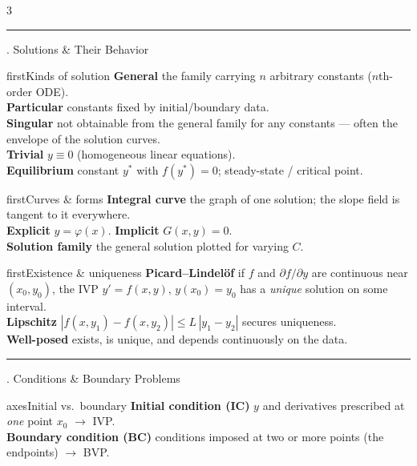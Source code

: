 \documentclass[10pt]{article}
\newcommand{\lab}[1]{\textcolor{ink}{\sffamily\footnotesize\textbf{#1}}\;}
\newcommand{\sect}[2]{%
  \begin{tcolorbox}[blanker, breakable, before skip=2pt, after skip=2pt]
    \begingroup\sffamily\bfseries\normalsize\color{#1}%
    {\color{#1}\rule[-1pt]{3pt}{12pt}}\;#2\endgroup
    \par\vspace{1pt}{\color{#1}\hrule height 1pt}
\end{tcolorbox}}
\begin{document}
\footnotesize\linespread{0.95}\selectfont
\begin{multicols}{3}

  \sect{first}{5.\; Solutions \& Their Behavior}

  \begin{card}{first}{Kinds of solution}
    \lab{General} the family carrying \(n\) arbitrary constants (\(n\)th-order ODE).\\
    \lab{Particular} constants fixed by initial/boundary data.\\
    \lab{Singular} not obtainable from the general family for any constants --- often the envelope of the solution curves.\\
    \lab{Trivial} \(y\equiv 0\) (homogeneous linear equations).\\
    \lab{Equilibrium} constant \(y^{\ast}\) with \(f(y^{\ast})=0\); steady-state / critical point.
  \end{card}

  \begin{card}{first}{Curves \& forms}
    \lab{Integral curve} the graph of one solution; the slope field is tangent to it everywhere.\\
    \lab{Explicit} \(y=\varphi(x)\). \quad\lab{Implicit} \(G(x,y)=0\).\\
    \lab{Solution family} the general solution plotted for varying \(C\).
  \end{card}

  \begin{card}{first}{Existence \& uniqueness}
    \lab{Picard--Lindel\"of} if \(f\) and \(\partial f/\partial y\) are continuous near \((x_{0},y_{0})\), the IVP \(y'=f(x,y),\,y(x_{0})=y_{0}\) has a \emph{unique} solution on some interval.\\
    \lab{Lipschitz} \(|f(x,y_{1})-f(x,y_{2})|\le L\,|y_{1}-y_{2}|\) secures uniqueness.\\
    \lab{Well-posed} exists, is unique, and depends continuously on the data.
  \end{card}

  \sect{axes}{6.\; Conditions \& Boundary Problems}

  \begin{card}{axes}{Initial vs.\ boundary}
    \lab{Initial condition (IC)} \(y\) and derivatives prescribed at \emph{one} point \(x_{0}\) \(\to\) IVP.\\
    \lab{Boundary condition (BC)} conditions imposed at two or more points (the endpoints) \(\to\) BVP.
  \end{card}


\end{multicols}
\end{document}
